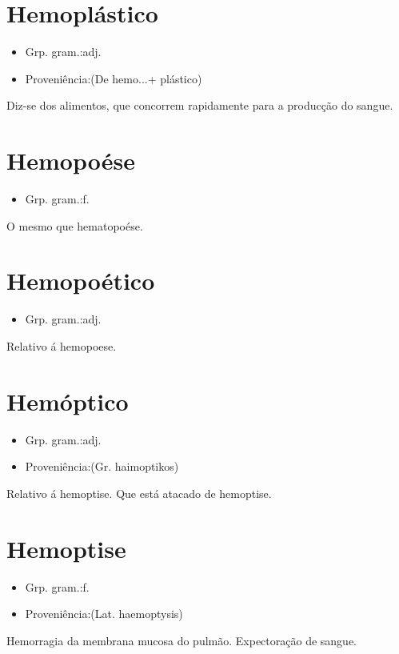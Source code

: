 \documentclass{article}
\begin{document}
\section{Hemoplástico}
\begin{itemize}
\item {Grp. gram.:adj.}
\end{itemize}
\begin{itemize}
\item {Proveniência:(De \textunderscore hemo...\textunderscore  + \textunderscore plástico\textunderscore )}
\end{itemize}
Diz-se dos alimentos, que concorrem rapidamente para a producção do sangue.
\section{Hemopoése}
\begin{itemize}
\item {Grp. gram.:f.}
\end{itemize}
O mesmo que \textunderscore hematopoése\textunderscore .
\section{Hemopoético}
\begin{itemize}
\item {Grp. gram.:adj.}
\end{itemize}
Relativo á hemopoese.
\section{Hemóptico}
\begin{itemize}
\item {Grp. gram.:adj.}
\end{itemize}
\begin{itemize}
\item {Proveniência:(Gr. \textunderscore haimoptikos\textunderscore )}
\end{itemize}
Relativo á hemoptise.
Que está atacado de hemoptise.
\section{Hemoptise}
\begin{itemize}
\item {Grp. gram.:f.}
\end{itemize}
\begin{itemize}
\item {Proveniência:(Lat. \textunderscore haemoptysis\textunderscore )}
\end{itemize}
Hemorragia da membrana mucosa do pulmão.
Expectoração de sangue.
\end{document}
